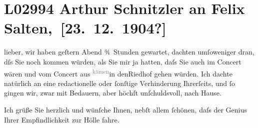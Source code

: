 

\section[ Arthur Schnitzler an Felix Salten, {[}23. 12. 1904?{]}]{L02994 Arthur Schnitzler an Felix Salten, {[}23. 12. 1904?{]}}
\nopagebreak{}
\rehead{ }\normalsize\beginnumbering{}
\toendnotes[C]{\smallbreak\pagebreak[2]}
\toendnotes[C]{\smallbreak}
\pstart
           \noindent{}{\pb}lieber, wir haben geſtern{ }Abend ¾ Stunden gewartet, dachten umſoweniger dran, dſs Sie noch kommen
               würden, als Sie mir ja \label{K_L02994-1v}\label{K_L02994-1} hatten, daſs Sie auch im Concert wären und vom Concert aus \substVorne{}\textsuperscript{\textcolor{gray}{kämen}}\substDazwischen{}in den\substHinten{}{ }Riedhof gehen {\pb}würden. Ich dachte natürlich an eine
               redactionelle oder ſonſtige Verhinderung Ihrerſeits, und ſo gingen wir, zwar mit
               Bedauern, aber höchſt unſchuldsvoll, nach Hause.\pend
           
\pstart
           Ich grüße Sie herzlich und wünſche Ihnen, nebſt allem ſchönen, daſs der Genius Ihrer
                  {\pb}Empfindlichkeit zur Hölle fahre.\pend
           
